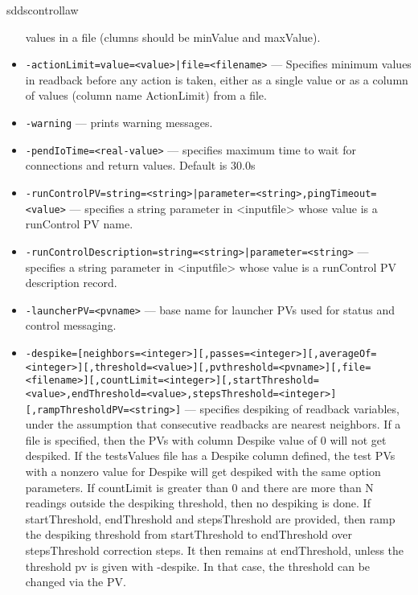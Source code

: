 \begin{sddsprog}{sddscontrollaw}
\begin{itemize}
               values in a file (clumns should be minValue and maxValue).
        \item {\tt -actionLimit=value=<value>|file=<filename>} --- Specifies minimum values in readback before any action is
               taken, either as a single value or as a column of values
               (column name ActionLimit) from a file.
        \item {\tt -warning} --- prints warning messages.
        \item {\tt -pendIoTime=<real-value>} --- specifies maximum time to wait for connections and
               return values.  Default is 30.0s 
        \item {\tt -runControlPV=string=<string>|parameter=<string>,pingTimeout=<value>} --- specifies a string parameter in <inputfile> whose value
               is a runControl PV name.
        \item {\tt -runControlDescription=string=<string>|parameter=<string>} ---
               specifies a string parameter in <inputfile> whose value
               is a runControl PV description record.
        \item {\tt -launcherPV=<pvname>} --- base name for launcher PVs used for status and control messaging.
        \item {\tt -despike=[neighbors=<integer>][,passes=<integer>][,averageOf=<integer>][,threshold=<value>][,pvthreshold=<pvname>][,file=<filename>][,countLimit=<integer>][,startThreshold=<value>,endThreshold=<value>,stepsThreshold=<integer>][,rampThresholdPV=<string>]} ---
                specifies despiking of readback variables,
               under the assumption
               that consecutive readbacks are nearest neighbors. If a file is
               specified, then the PVs with column Despike value of 0 will not
               get despiked. If the testsValues file has a Despike column defined,
               the test PVs with a nonzero value for Despike will get despiked
               with the same option parameters. If countLimit is greater than 0
               and there are more than N readings outside the despiking threshold,
               then no despiking is done.
               If startThreshold, endThreshold and stepsThreshold 
               are provided, then ramp the despiking threshold from startThreshold to 
               endThreshold over stepsThreshold correction steps. It then remains at 
               endThreshold, unless the threshold pv is given with -despike.  
               In that case, the threshold can be changed via the PV.

\end{itemize}
\end{sddsprog}
